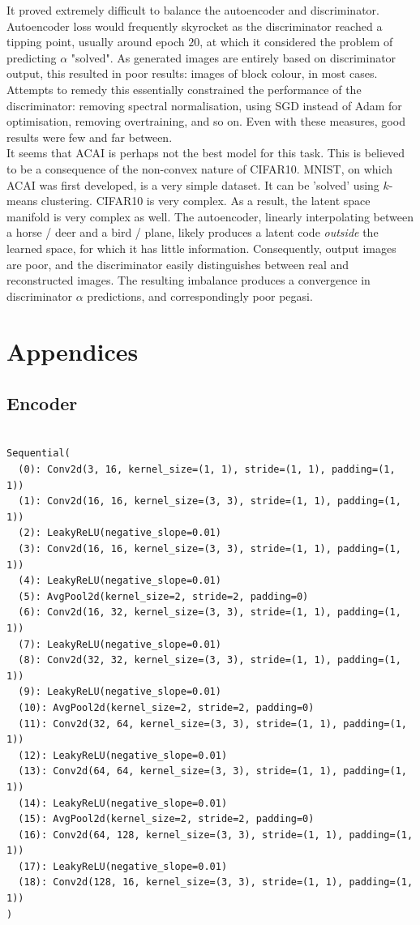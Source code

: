 \documentclass[11pt]{article} %
\begin{document}
It proved extremely difficult to balance the autoencoder and discriminator. Autoencoder loss would frequently skyrocket as the discriminator reached a tipping point, usually around epoch $20$, at which it considered the problem of predicting $\alpha$ "solved". As generated images are entirely based on discriminator output, this resulted in poor results: images of block colour, in most cases. Attempts to remedy this essentially constrained the performance of the discriminator: removing spectral normalisation, using SGD instead of Adam for optimisation, removing overtraining, and so on. Even with these measures, good results were few and far between. \\

It seems that ACAI is perhaps not the best model for this task. This is believed to be a consequence of the non-convex nature of CIFAR10. MNIST, on which ACAI was first developed, is a very simple dataset. It can be 'solved' using $k$-means clustering. CIFAR10 is very complex. As a result, the latent space manifold is very complex as well. The autoencoder, linearly interpolating between a horse / deer and a bird / plane, likely produces a latent code \textit{outside} the learned space, for which it has little information. Consequently, output images are poor, and the discriminator easily distinguishes between real and reconstructed images. The resulting imbalance produces a convergence in discriminator $\alpha$ predictions, and correspondingly poor pegasi.
\printbibliography

\clearpage
\section{Appendices}

\subsection{Encoder}

\begin{verbatim}

Sequential(
  (0): Conv2d(3, 16, kernel_size=(1, 1), stride=(1, 1), padding=(1, 1))
  (1): Conv2d(16, 16, kernel_size=(3, 3), stride=(1, 1), padding=(1, 1))
  (2): LeakyReLU(negative_slope=0.01)
  (3): Conv2d(16, 16, kernel_size=(3, 3), stride=(1, 1), padding=(1, 1))
  (4): LeakyReLU(negative_slope=0.01)
  (5): AvgPool2d(kernel_size=2, stride=2, padding=0)
  (6): Conv2d(16, 32, kernel_size=(3, 3), stride=(1, 1), padding=(1, 1))
  (7): LeakyReLU(negative_slope=0.01)
  (8): Conv2d(32, 32, kernel_size=(3, 3), stride=(1, 1), padding=(1, 1))
  (9): LeakyReLU(negative_slope=0.01)
  (10): AvgPool2d(kernel_size=2, stride=2, padding=0)
  (11): Conv2d(32, 64, kernel_size=(3, 3), stride=(1, 1), padding=(1, 1))
  (12): LeakyReLU(negative_slope=0.01)
  (13): Conv2d(64, 64, kernel_size=(3, 3), stride=(1, 1), padding=(1, 1))
  (14): LeakyReLU(negative_slope=0.01)
  (15): AvgPool2d(kernel_size=2, stride=2, padding=0)
  (16): Conv2d(64, 128, kernel_size=(3, 3), stride=(1, 1), padding=(1, 1))
  (17): LeakyReLU(negative_slope=0.01)
  (18): Conv2d(128, 16, kernel_size=(3, 3), stride=(1, 1), padding=(1, 1))
)

\end{verbatim}
\end{document}
